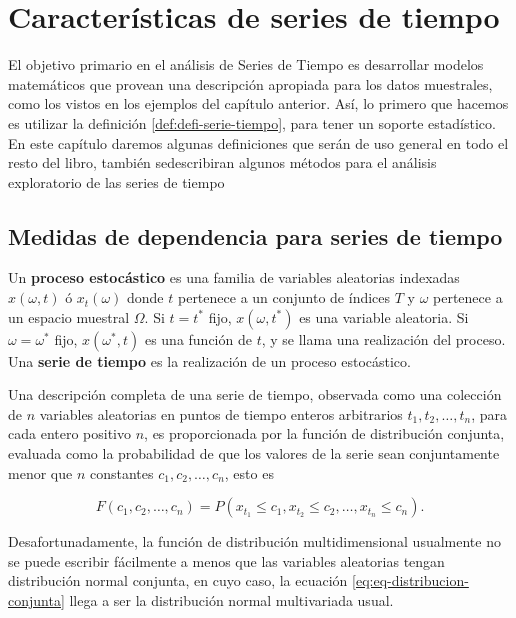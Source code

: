 \documentclass[12pt,]{krantz}
\theoremstyle{definition}
\theoremstyle{definition}
\theoremstyle{definition}
\theoremstyle{remark}
\let\BeginKnitrBlock\begin \let\EndKnitrBlock\end
\begin{document}
\chapter{Características de series de
tiempo}\label{caracteristicas-de-series-de-tiempo}

El objetivo primario en el análisis de Series de Tiempo es desarrollar
modelos matemáticos que provean una descripción apropiada para los datos
muestrales, como los vistos en los ejemplos del capítulo anterior. Así,
lo primero que hacemos es utilizar la definición
\ref{def:defi-serie-tiempo}, para tener un soporte estadístico. En este
capítulo daremos algunas definiciones que serán de uso general en todo
el resto del libro, también sedescribiran algunos métodos para el
análisis exploratorio de las series de tiempo

\section{Medidas de dependencia para series de
tiempo}\label{medidas-de-dependencia-para-series-de-tiempo}

\BeginKnitrBlock{definition}
\protect\hypertarget{def:defi-proceso-estocastico}{}{\label{def:defi-proceso-estocastico}
}Un \textbf{proceso estocástico} es una familia de variables aleatorias
indexadas \(x(\omega,t)\) ó \(x_t(\omega)\) donde \(t\) pertenece a un
conjunto de índices \(T\) y \(\omega\) pertenece a un espacio muestral
\(\Omega\). Si \(t=t^*\) fijo, \(x(\omega,t^*)\) es una variable
aleatoria. Si \(\omega=\omega^*\) fijo, \(x(\omega^*,t)\) es una función
de \(t\), y se llama una realización del proceso. Una \textbf{serie de
tiempo} es la realización de un proceso estocástico.
\EndKnitrBlock{definition}

Una descripción completa de una serie de tiempo, observada como una
colección de \(n\) variables aleatorias en puntos de tiempo enteros
arbitrarios \(t_1,t_2,\ldots,t_n\), para cada entero positivo \(n\), es
proporcionada por la función de distribución conjunta, evaluada como la
probabilidad de que los valores de la serie sean conjuntamente menor que
\(n\) constantes \(c_1,c_2,\ldots,c_n\), esto es

\begin{equation}
F(c_1,c_2,\ldots,c_n)=P(x_{t_1}\leq c_1,x_{t_2}\leq c_2,\ldots,x_{t_n}\leq c_n).
\label{eq:eq-distribucion-conjunta}
\end{equation}

Desafortunadamente, la función de distribución multidimensional
usualmente no se puede escribir fácilmente a menos que las variables
aleatorias tengan distribución normal conjunta, en cuyo caso, la
ecuación \eqref{eq:eq-distribucion-conjunta} llega a ser la distribución
normal multivariada usual.
\end{document}
